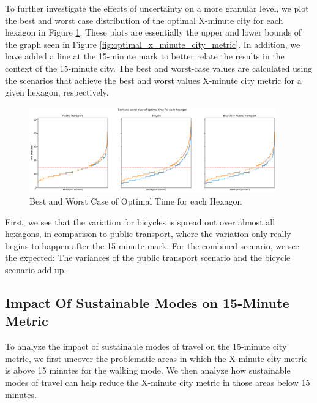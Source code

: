 To further investigate the effects of uncertainty on a more granular level, we plot the best and worst case distribution of the optimal X-minute city for each hexagon in Figure \ref{fig:best_and_worst_case_of_optimal_time_for_each_hexagon}.
These plots are essentially the upper and lower bounds of the graph seen in Figure \ref{fig:optimal_x_minute_city_metric}.
In addition, we have added a line at the 15-minute mark to better relate the results in the context of the 15-minute city.
The best and worst-case values are calculated using the scenarios that achieve the best and worst values X-minute city metric for a given hexagon, respectively.
\begin{figure}
  \begin{center}
    \includegraphics[width=0.95\textwidth]{Figures/results/uncertainty/optimal_best_worst_case}
  \end{center}
  \caption{Best and Worst Case of Optimal Time for each Hexagon}
  \label{fig:best_and_worst_case_of_optimal_time_for_each_hexagon}
\end{figure}
First, we see that the variation for bicycles is spread out over almost all hexagons, in comparison to public transport, where the variation only really begins to happen after the 15-minute mark.
For the combined scenario, we see the expected: The variances of the public transport scenario and the bicycle scenario add up.

\subsection{Impact Of Sustainable Modes on 15-Minute Metric}
\label{subsec:impact_of_sustainable_modes_on_15_minute_metric}

To analyze the impact of sustainable modes of travel on the 15-minute city metric, we first uncover the problematic areas in which the X-minute city metric is above 15 minutes for the walking mode.
We then analyze how sustainable modes of travel can help reduce the X-minute city metric in those areas below 15 minutes.

